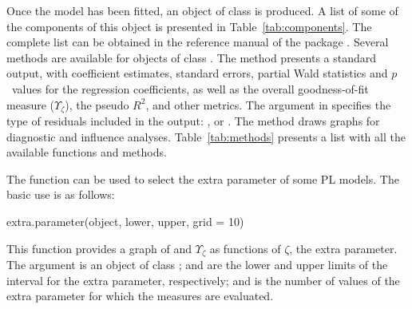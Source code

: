 Once the model has been fitted, an object of  class  is produced. A list of some of the components of this object is presented in Table~\ref{tab:components}. The complete list can be obtained in the reference manual of the package \citep{QueirozFerrari2022}. Several methods are available for objects of class . The  method presents a standard output, with coefficient estimates, standard errors, partial Wald statistics and $p$~values for the regression coefficients, as well as the overall goodness-of-fit measure ($\Upsilon_\zeta$), the pseudo $R^2$, and other metrics. The argument  in  specifies the type of residuals included in the output: ,  or . The  method draws graphs for diagnostic and influence analyses. Table~\ref{tab:methods} presents a list with all the available functions and methods.

The  function can be used to select the extra parameter of some PL models. The basic use is as follows:
\begin{Scode}
extra.parameter(object, lower, upper, grid = 10)
\end{Scode}
This function provides a graph of  and $\Upsilon_\zeta$ as functions of $\zeta$, the extra parameter. The  argument is an object of class ;  and  are the lower and upper limits of the interval for the extra parameter, respectively; and  is the number of values of the extra parameter for which the measures are evaluated.

